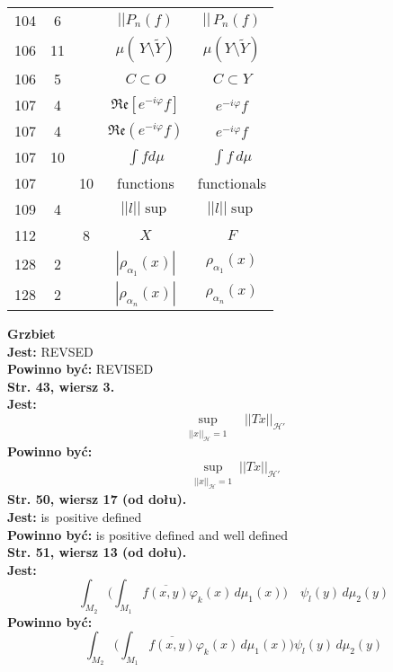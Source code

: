 \documentclass[a4paper,11pt]{article}
\newcommand{\tb}{\textbf}
\newcommand{\noi}{\noindent}
\newcommand{\tb}{\textbf}
\newcommand{\noi}{\noindent}
\newcommand{\StrWg}[2]{\tb{Str. #1, wiersz #2.}}
\newcommand{\StrWd}[2]{\tb{Str. #1, wiersz #2 (od dołu).}}
\newcommand{\Jest}{\tb{Jest: }}
\newcommand{\Pow}{\tb{Powinno być: }}
\newcommand{\ol}{\overline}
\newcommand{\wt}{\widetilde}
\newcommand{\mc}{\mathcal}
\newcommand{\mf}{\mathfrak}
\newcommand{\norm}[1]{\left|\left| #1 \right|\right|}
\newcommand{\al}{\alpha}
\newcommand{\vp}{\varphi}
\newcommand{\Hc}{\mc{H}}
\newcommand{\subs}{\subset}
\newcommand{\setm}{\setminus}
\newcommand{\Real}{\mf{Re}}
\newcommand{\Int}{\int\limits}
\newcommand{\Int}{\int\limits}
\newcommand{\IntCaD}[2] { \Int #1 \, d#2 } %
\newcommand{\Jest}{\tb{Jest: }}
\newcommand{\Pow}{\tb{Powinno być: }}
\begin{document}
\begin{center}
\begin{tabular}{|c|c|c|c|c|}
    104 &  6 & & $||P_{ n }( f )$ & $|| \, P_{ n }( f )$ \\
    106 & 11 & & $\mu( \, Y \setm \wt{ Y } )$
           & $\mu( Y \setm \wt{ Y } )$ \\
    106 &  5 & & $C \subs O$ & $C \subs Y$ \\
    107 &  4 & & $\Real[ e^{ -i \vp } f ]$ & $e^{ -i \vp } f$ \\
    107 &  4 & & $\Real( e^{ -i \vp } f )$ & $e^{ -i \vp } f$ \\
    107 & 10 & & $\int\! fd\mu$ & $\IntCaD{ f }{ \mu }$ \\
    107 & & 10 & functions & functionals \\
    109 & 4 & & $\norm{ l }\!\sup$ & $\norm{ l } \sup$ \\
    112 & & 8 & $X$ & $F$ \\
    128 & 2 & & $| \rho_{ \al_{ 1 } }( x ) |$ & $\rho_{ \al_{ 1 } }( x )$ \\
    128 & 2 & & $| \rho_{ \al_{ n } }( x ) |$ & $\rho_{ \al_{ n } }( x )$ \\
    \hline
  \end{tabular}
\end{center}
\noi
\tb{Grzbiet} \\
\Jest REVSED \\
\Pow  REVISED \\
\StrWg{43}{3} \\
\Jest
\begin{equation*}
  \sup_{ \substack{ \norm{ x }_{ \Hc } = 1 } } \;\;\; \norm{ T x }_{ \Hc' }
\end{equation*}
\Pow
\begin{equation*}
  \sup_{ \substack{ \norm{ x }_{ \Hc } = 1 } } \norm{ T x }_{ \Hc' }
\end{equation*}
\StrWd{50}{17} \\
\Jest is~positive defined \\
\Pow  is positive defined and well defined \\
\StrWd{51}{13} \\
\Jest
\begin{equation*}
  \int_{ M_{ 2 } } \bigg( \int_{ M_{ 1 } } \ol{ f( x, y ) } \vp_{ k }( x ) \,
  d\mu_{ 1 }( x ) \bigg) \quad \psi_{ l }( y ) \, d\mu_{ 2 }( y )
\end{equation*}
\Pow
\begin{equation*}
  \int_{ M_{ 2 } } \bigg( \int_{ M_{ 1 } } \ol{ f( x, y ) } \vp_{ k }( x ) \,
  d\mu_{ 1 }( x ) \bigg) \psi_{ l }( y ) \, d\mu_{ 2 }( y )
\end{equation*}





 {}



\end{document}
